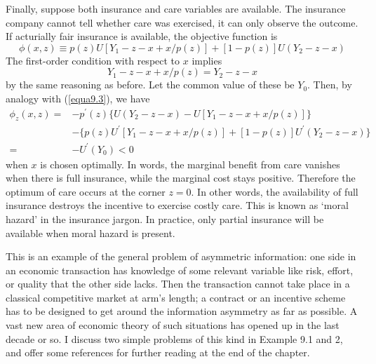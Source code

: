 Finally, suppose both insurance and care variables are available. The insurance company cannot tell whether care was exercised, it can only observe the outcome. If acturially fair insurance is available, the objective function is
\begin{equation*}
\phi(x,z) \equiv p(z) U[Y_1 -z -x + x/p(z)] + [1-p(z)] U(Y_2 -z-x)
\end{equation*}
The first-order condition with respect to $x$ implies
\begin{equation*}
 Y_1 -z -x + x/p(z) = Y_2 -z-x
\end{equation*}
by the same reasoning as before. Let the common value of these be $Y_0$. Then, by analogy with (\ref{equa9.3}), we have
\begin{equation*}
\begin{array}{rl}
 \phi_z(x,z) =& -p^\prime(z) \{ U(Y_2-z-x) -U[Y_1-z-x+x/p(z)]  \} \\
              & -\{ p(z)U^\prime [Y_1-z-x+x/p(z)] + [1-p(z)]U^\prime(Y_2-z-x)  \} \\
             =& -U^\prime(Y_0) < 0
\end{array}
\end{equation*}
when $x$ is chosen optimally. In words, the marginal benefit from care vanishes when there is full insurance, while the marginal cost stays positive. Therefore the optimum of care occurs at the corner $z=0$. In other words, the availability of full insurance destroys the incentive to exercise costly care. This is known as `moral hazard' in the insurance jargon. In practice, only partial insurance will be available when moral hazard is present.

This is an example of the general problem of asymmetric information: one side in an economic transaction has knowledge of some relevant variable like risk, effort, or quality that the other side lacks. Then the transaction cannot take place in a classical competitive market at arm's length; a contract or an incentive scheme has to be designed to get around the information asymmetry as far as possible. A vast new area of economic theory of such situations has opened up in the last decade or so. I discuss two simple problems of this kind in Example 9.1 and 2, and offer some references for further reading at the end of the chapter.

